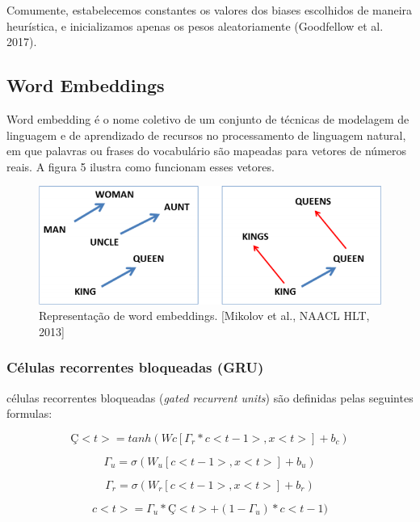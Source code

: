 \documentclass[12pt]{article}
\begin{document}
Comumente, estabelecemos constantes os valores dos biases escolhidos de maneira heurística, e inicializamos apenas os pesos aleatoriamente (Goodfellow et al. 2017).

\subsection{Word Embeddings}

Word embedding é o nome coletivo de um conjunto de técnicas de modelagem de linguagem e de aprendizado de recursos no processamento de linguagem natural, em que palavras ou frases do vocabulário são mapeadas para vetores de números reais. A figura 5 ilustra como funcionam esses vetores.
\begin{figure}
  \centering
  \includegraphics[width=1\textwidth]{images/wordembeddings.png}
  \caption{
    Representação de word embeddings. [Mikolov et al., NAACL HLT, 2013]
  }
  \label{}
\end{figure}

\subsubsection{Células recorrentes bloqueadas (GRU)}

células recorrentes bloqueadas (\textit{gated recurrent units}) são definidas pelas seguintes formulas:

\begin{equation}
    Ç<t> = tanh(Wc[\Gamma_r * c<t-1>, x<t>]+b_c)
\end{equation}

\begin{equation}
    \Gamma_u = \sigma(W_u[c<t-1>, x<t>]+b_u)
\end{equation}

\begin{equation}
    \Gamma_r = \sigma(W_r[c<t-1>, x<t>]+b_r)
\end{equation}

\begin{equation}
    c<t>=\Gamma_u*Ç<t>+(1-\Gamma_u)*c<t-1)
\end{equation}
\end{document}

